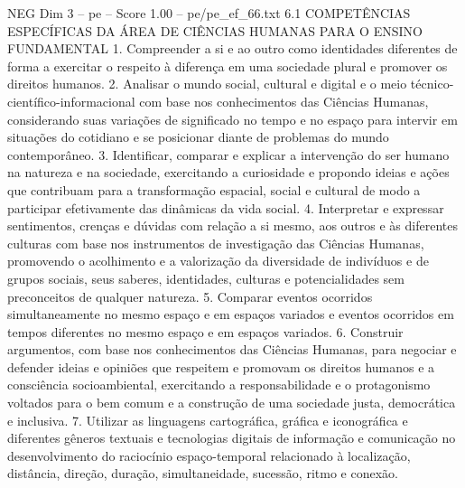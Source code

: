 \begin{textsample}{NEG Dim 3 – pe – Score 1.00 – pe/pe\_ef\_66.txt}  \label{ex:f3_neg_010}
6.1 COMPETÊNCIAS ESPECÍFICAS DA ÁREA DE CIÊNCIAS HUMANAS PARA O ENSINO FUNDAMENTAL 1.
Compreender a si e ao outro como identidades diferentes de forma a exercitar o respeito à diferença em uma sociedade plural e promover os direitos humanos. 2.
Analisar o mundo social, cultural e digital e o meio técnico-científico-informacional com base nos conhecimentos das Ciências Humanas, considerando suas variações de significado no tempo e no espaço para intervir em situações do cotidiano e se posicionar diante de problemas do mundo contemporâneo. 3.
Identificar, comparar e explicar a intervenção do ser humano na natureza e na sociedade, exercitando a curiosidade e propondo ideias e ações que contribuam para a transformação espacial, social e cultural de modo a participar efetivamente das dinâmicas da vida social. 4.
Interpretar e expressar sentimentos, crenças e dúvidas com relação a si mesmo, aos outros e às diferentes culturas com base nos instrumentos de investigação das Ciências Humanas, promovendo o acolhimento e a valorização da diversidade de indivíduos e de grupos sociais, seus saberes, identidades, culturas e potencialidades sem preconceitos de qualquer natureza. 5.
Comparar eventos ocorridos simultaneamente no mesmo espaço e em espaços variados e eventos ocorridos em tempos diferentes no mesmo espaço e em espaços variados. 6.
Construir argumentos, com base nos conhecimentos das Ciências Humanas, para negociar e defender ideias e opiniões que respeitem e promovam os direitos humanos e a consciência socioambiental, exercitando a responsabilidade e o protagonismo voltados para o bem comum e a construção de uma sociedade justa, democrática e inclusiva. 7.
Utilizar as linguagens cartográfica, gráfica e iconográfica e diferentes gêneros textuais e tecnologias digitais de informação e comunicação no desenvolvimento do raciocínio espaço-temporal relacionado à localização, distância, direção, duração, simultaneidade, sucessão, ritmo e conexão.

\end{textsample}
